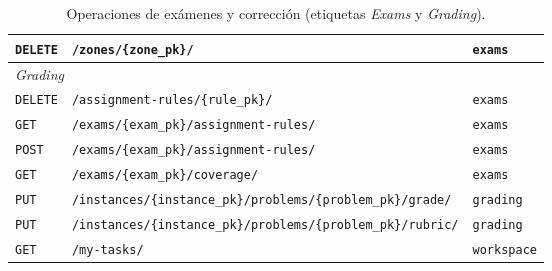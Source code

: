 \begin{table}[htbp]
\begin{tabular}{llp{3.6cm}}
    \texttt{DELETE} & \texttt{/zones/\{zone\_pk\}/} & \texttt{exams} \\
    \midrule
    \multicolumn{3}{l}{\textit{Grading}} \\
    \texttt{DELETE} & \texttt{/assignment-rules/\{rule\_pk\}/} & \texttt{exams} \\
    \texttt{GET} & \texttt{/exams/\{exam\_pk\}/assignment-rules/} & \texttt{exams} \\
    \texttt{POST} & \texttt{/exams/\{exam\_pk\}/assignment-rules/} & \texttt{exams} \\
    \texttt{GET} & \texttt{/exams/\{exam\_pk\}/coverage/} & \texttt{exams} \\
    \texttt{PUT} & \texttt{/instances/\{instance\_pk\}/problems/\{problem\_pk\}/grade/} & \texttt{grading} \\
    \texttt{PUT} & \texttt{/instances/\{instance\_pk\}/problems/\{problem\_pk\}/rubric/} & \texttt{grading} \\
    \texttt{GET} & \texttt{/my-tasks/} & \texttt{workspace} \\
    \bottomrule
  \end{tabular}
  \caption{Operaciones de exámenes y corrección (etiquetas \textit{Exams} y
    \textit{Grading}).\label{TAB:API-EXAMS}}
\end{table}

